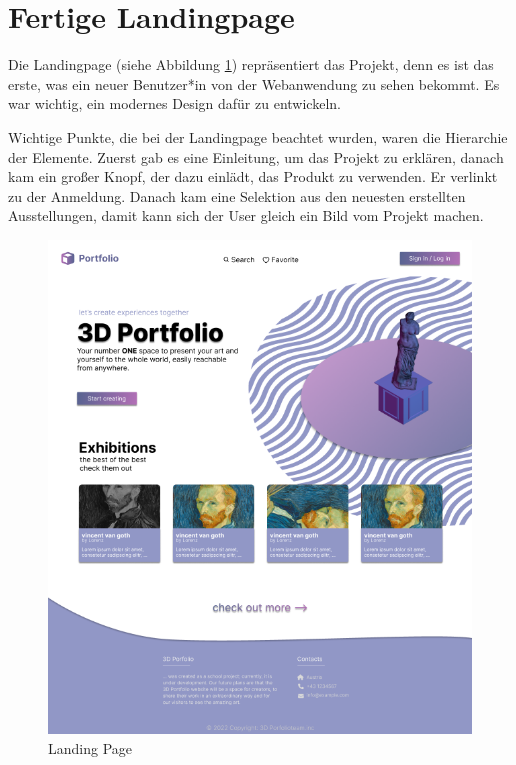 \section{Fertige Landingpage}
Die Landingpage (siehe Abbildung \ref{fig:impl:finishedLandingpage}) repräsentiert das Projekt, denn es ist das erste, was ein neuer Benutzer*in von der Webanwendung zu sehen bekommt. Es war wichtig, ein modernes Design dafür zu entwickeln.

Wichtige Punkte, die bei der Landingpage beachtet wurden, waren die Hierarchie der Elemente. Zuerst gab es eine Einleitung, um das Projekt zu erklären, danach kam ein großer Knopf, der dazu einlädt, das Produkt zu verwenden. Er verlinkt zu der Anmeldung. Danach kam eine Selektion aus den neuesten erstellten Ausstellungen, damit kann sich der User gleich ein Bild vom Projekt machen.

\begin{figure}
    \centering
    \includegraphics[scale=.5]{pics/startingpage.png}
    \caption{Landing Page}
    \label{fig:impl:finishedLandingpage}
\end{figure}

